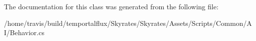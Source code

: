 The documentation for this class was generated from the following file\-:\begin{DoxyCompactItemize}
\item 
/home/travis/build/temportalflux/\-Skyrates/\-Skyrates/\-Assets/\-Scripts/\-Common/\-A\-I/Behavior.\-cs\end{DoxyCompactItemize}
